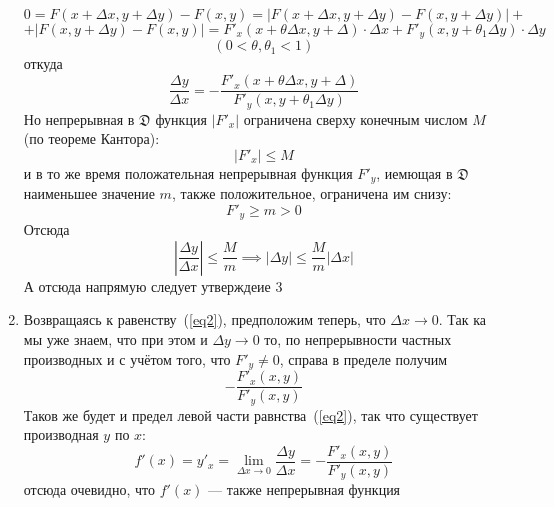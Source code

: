 \begin{enumerate}
    \begin{equation*}
        0 = F(x + \Delta x, y + \Delta y) - F(x, y) = |F(x + \Delta x, y + \Delta y) - F(x, y + \Delta y)| +
    \end{equation*}
    \begin{equation*}
        + |F(x, y + \Delta y) - F(x, y)| = F'_x(x + \theta \Delta x, y + \Delta )\cdot \Delta x + F'_y(x, y + \theta_1 \Delta y)\cdot\Delta y
    \end{equation*}
    \begin{equation*}
        (0 < \theta, \theta_1 < 1)
    \end{equation*}
    откуда
    \begin{equation}\label{eq2}
        \frac{\Delta y}{\Delta x} = - \frac{F'_x(x + \theta \Delta x, y + \Delta )}{F'_y(x, y + \theta_1 \Delta y)}
    \end{equation}
    Но непрерывная в $\mathfrak{D}$ функция $|F'_x|$ ограничена сверху конечным числом $M$ (по теореме Кантора):
    \begin{equation*}
        |F'_x| \leq M
    \end{equation*}
    и в то же время положательная непрерывная функция $F'_y$, иемющая в $\mathfrak{D}$ наименьшее значение $m$, также положительное, ограничена им снизу:
    \begin{equation*}
        F'_y \geq m > 0
    \end{equation*}
    Отсюда
    \begin{equation*}
        \left| \frac{\Delta y}{\Delta x} \right| \leq \frac{M}{m} \implies |\Delta y| \leq \frac{M}{m}|\Delta x|
    \end{equation*}
    А отсюда напрямую следует утверждеие 3
    \item Возвращаясь к равенству~(\ref{eq2}), предположим теперь, что $\Delta x \rightarrow 0$. Так ка мы уже знаем, что при этом и $\Delta y \rightarrow 0$ то, по непрерывности частных производных и с учётом того, что $F'_y \neq 0$, справа в пределе получим
    \begin{equation*}
        - \frac{F'_x(x, y)}{F'_y(x, y)}
    \end{equation*}
    Таков же будет и предел левой части равнства~(\ref{eq2}), так что существует производная $y$ по $x$:
    \begin{equation*}
        f'(x) = y'_x = \lim_{\Delta x \to 0}\frac{\Delta y}{\Delta x} = - \frac{F'_x(x, y)}{F'_y(x, y)}
    \end{equation*}
    отсюда очевидно, что $f'(x)$ --- также непрерывная функция
\end{enumerate}

